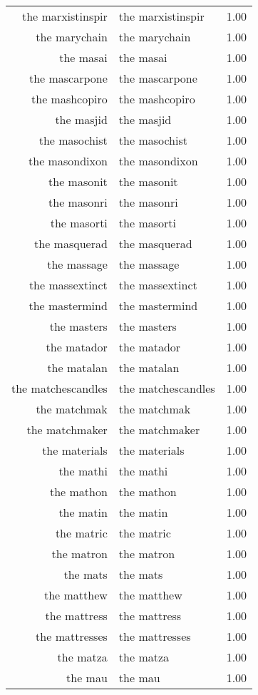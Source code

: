 \begin{table}[ht]
\begin{tabular}{rlr}
  the marxistinspir & the marxistinspir & 1.00 \\ 
  the marychain & the marychain & 1.00 \\ 
  the masai & the masai & 1.00 \\ 
  the mascarpone & the mascarpone & 1.00 \\ 
  the mashcopiro & the mashcopiro & 1.00 \\ 
  the masjid & the masjid & 1.00 \\ 
  the masochist & the masochist & 1.00 \\ 
  the masondixon & the masondixon & 1.00 \\ 
  the masonit & the masonit & 1.00 \\ 
  the masonri & the masonri & 1.00 \\ 
  the masorti & the masorti & 1.00 \\ 
  the masquerad & the masquerad & 1.00 \\ 
  the massage & the massage & 1.00 \\ 
  the massextinct & the massextinct & 1.00 \\ 
  the mastermind & the mastermind & 1.00 \\ 
  the masters & the masters & 1.00 \\ 
  the matador & the matador & 1.00 \\ 
  the matalan & the matalan & 1.00 \\ 
  the matchescandles & the matchescandles & 1.00 \\ 
  the matchmak & the matchmak & 1.00 \\ 
  the matchmaker & the matchmaker & 1.00 \\ 
  the materials & the materials & 1.00 \\ 
  the mathi & the mathi & 1.00 \\ 
  the mathon & the mathon & 1.00 \\ 
  the matin & the matin & 1.00 \\ 
  the matric & the matric & 1.00 \\ 
  the matron & the matron & 1.00 \\ 
  the mats & the mats & 1.00 \\ 
  the matthew & the matthew & 1.00 \\ 
  the mattress & the mattress & 1.00 \\ 
  the mattresses & the mattresses & 1.00 \\ 
  the matza & the matza & 1.00 \\ 
  the mau & the mau & 1.00 \\ 

\end{tabular}
\end{table}

